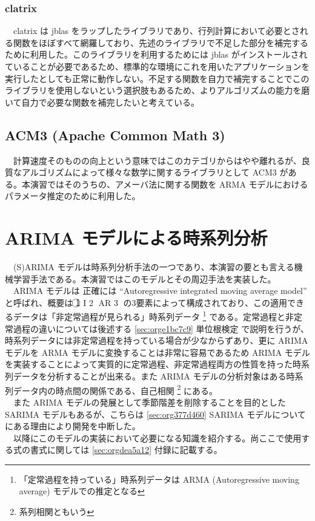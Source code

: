 \documentclass[dvipdfmx]{scrartcl}
\begin{document}
\subsubsection{clatrix}
\label{sec:org980e1d1}
　clatrix は jblas をラップしたライブラリであり、行列計算において必要とされる関数をほぼすべて網羅しており、先述のライブラリで不足した部分を補完するために利用した。このライブラリを利用するためには jblas がインストールされていることが必要であるため、標準的な環境にこれを用いたアプリケーションを実行したとしても正常に動作しない。不足する関数を自力で補完することでこのライブラリを使用しないという選択肢もあるため、よりアルゴリズムの能力を磨いて自力で必要な関数を補完したいと考えている。\\

\subsection{ACM3 (Apache Common Math 3)}
\label{sec:orga5a15e8}
　計算速度そのものの向上という意味ではこのカテゴリからはやや離れるが、良質なアルゴリズムによって様々な数学に関するライブラリとして ACM3 がある。本演習ではそのうちの、アメーバ法に関する関数を ARMA モデルにおけるパラメータ推定のために利用した。\\
\section{ARIMA モデルによる時系列分析}
\label{sec:org1cacaf1}
　(S)ARIMA モデルは時系列分析手法の一つであり、本演習の要とも言える機械学習手法である。本演習ではこのモデルとその周辺手法を実装した。\\
　ARIMA モデルは 正確には ``Autoregressive integrated moving average model'' と呼ばれ、概要は \textcircled{\scriptsize 1} I \textcircled{\scriptsize 2} AR \textcircled{\scriptsize 3} の3要素によって構成されており、この適用できるデータは「非定常過程が見られる」時系列データ \footnote{「定常過程を持っている」時系列データは ARMA (Autoregressive moving average) モデルでの推定となる} である。定常過程と非定常過程の違いについては後述する \ref{sec:orge1bc7c9} 単位根検定 で説明を行うが、時系列データには非定常過程を持っている場合が少なからずあり、更に ARIMA モデルを ARMA モデルに変換することは非常に容易であるため ARIMA モデルを実装することによって実質的に定常過程、非定常過程両方の性質を持った時系列データを分析することが出来る。また ARIMA モデルの分析対象はある時系列データ内の時点間の関係である、自己相関 \footnote{系列相関ともいう} にある。\\
　また ARIMA モデルの発展として季節階差を削除することを目的とした SARIMA モデルもあるが、こちらは \ref{sec:org377d460} SARIMA モデルについて にある理由により開発を中断した。\\
　以降にこのモデルの実装において必要になる知識を紹介する。尚ここで使用する式の書式に関しては \ref{sec:orgdea5a12} 付録に記載する。\\
\end{document}
